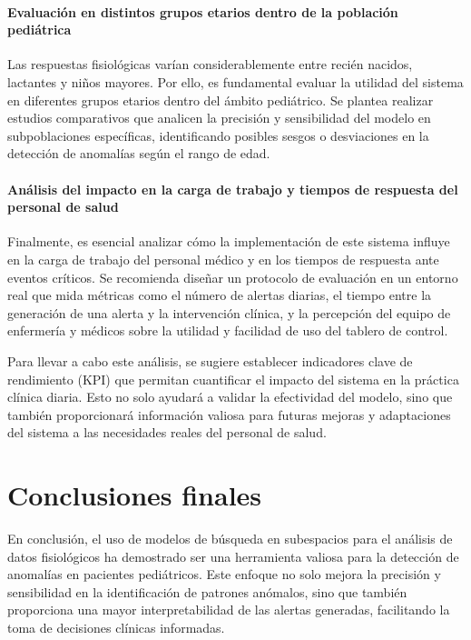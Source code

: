 \paragraph{Evaluación en distintos grupos etarios dentro de la población pediátrica}

Las respuestas fisiológicas varían considerablemente entre recién nacidos, lactantes y niños mayores. Por ello, es fundamental evaluar la utilidad del sistema en diferentes grupos etarios dentro del ámbito pediátrico. Se plantea realizar estudios comparativos que analicen la precisión y sensibilidad del modelo en subpoblaciones específicas, identificando posibles sesgos o desviaciones en la detección de anomalías según el rango de edad.

\paragraph{Análisis del impacto en la carga de trabajo y tiempos de respuesta del personal de salud}

Finalmente, es esencial analizar cómo la implementación de este sistema influye en la carga de trabajo del personal médico y en los tiempos de respuesta ante eventos críticos. Se recomienda diseñar un protocolo de evaluación en un entorno real que mida métricas como el número de alertas diarias, el tiempo entre la generación de una alerta y la intervención clínica, y la percepción del equipo de enfermería y médicos sobre la utilidad y facilidad de uso del tablero de control.

Para llevar a cabo este análisis, se sugiere establecer indicadores clave de rendimiento (KPI) que permitan cuantificar el impacto del sistema en la práctica clínica diaria. Esto no solo ayudará a validar la efectividad del modelo, sino que también proporcionará información valiosa para futuras mejoras y adaptaciones del sistema a las necesidades reales del personal de salud.

\section{Conclusiones finales}

En conclusión, el uso de modelos de búsqueda en subespacios para el análisis de datos fisiológicos ha demostrado ser una herramienta valiosa para la detección de anomalías en pacientes pediátricos. Este enfoque no solo mejora la precisión y sensibilidad en la identificación de patrones anómalos, sino que también proporciona una mayor interpretabilidad de las alertas generadas, facilitando la toma de decisiones clínicas informadas.

